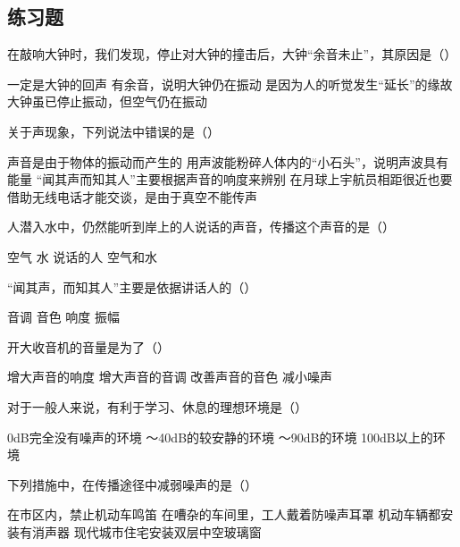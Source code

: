 \documentclass[12pt]{exam}
\begin{document}
\begin{Aquestions}
\newpage
\section{练习题}
\begin{questions}
\question
在敲响大钟时，我们发现，停止对大钟的撞击后，大钟“余音未止”，其原因是（\answerline*[B]）
\begin{choices}
\choice 一定是大钟的回声
\choice 有余音，说明大钟仍在振动
\choice 是因为人的听觉发生“延长”的缘故
\choice 大钟虽已停止振动，但空气仍在振动
\end{choices}


\question
关于声现象，下列说法中错误的是（\answerline*[C]）
\begin{choices}
\choice 声音是由于物体的振动而产生的
\choice 用声波能粉碎人体内的“小石头”，说明声波具有能量
\choice “闻其声而知其人”主要根据声音的响度来辨别
\choice 在月球上宇航员相距很近也要借助无线电话才能交谈，是由于真空不能传声
\end{choices}


\question
人潜入水中，仍然能听到岸上的人说话的声音，传播这个声音的是（）

\begin{oneparchoices}
\choice 空气
\choice 水
\choice 说话的人
\choice 空气和水
\end{oneparchoices}


\question
“闻其声，而知其人”主要是依据讲话人的（\answerline*[B]）   

\begin{oneparchoices}
\choice 音调
\choice 音色
\choice 响度
\choice 振幅
\end{oneparchoices}


\question
开大收音机的音量是为了（\answerline*[A]）
\begin{choices}
\choice 增大声音的响度
\choice 增大声音的音调
\choice 改善声音的音色
\choice 减小噪声
\end{choices}


\question
对于一般人来说，有利于学习、休息的理想环境是（\answerline*[B]）
\begin{choices}
\choice 0dB完全没有噪声的环境
～40dB的较安静的环境
～90dB的环境
\choice 100dB以上的环境
\end{choices}


\question
下列措施中，在传播途径中减弱噪声的是（\answerline*[D]）
\begin{choices}
\choice 在市区内，禁止机动车鸣笛
\choice 在嘈杂的车间里，工人戴着防噪声耳罩
\choice 机动车辆都安装有消声器
\choice 现代城市住宅安装双层中空玻璃窗
\end{choices}



\end{questions}
\end{Aquestions}
\end{document}

